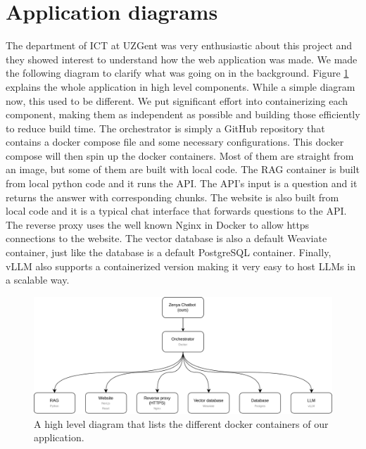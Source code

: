 \section{Application diagrams}
The department of ICT at UZGent was very enthusiastic about this project and they showed interest to understand how the web application was made. We made the following diagram to clarify what was going on in the background. Figure \ref{fig:architecture_docker} explains the whole application in high level components. While a simple diagram now, this used to be different. We put significant effort into containerizing each component, making them as independent as possible and building those efficiently to reduce build time. The orchestrator is simply a GitHub repository that contains a docker compose file and some necessary configurations. This docker compose will then spin up the docker containers. Most of them are straight from an image, but some of them are built with local code. The RAG container is built from local python code and it runs the API. The API's input is a question and it returns the answer with corresponding chunks. The website is also built from local code and it is a typical chat interface that forwards questions to the API. The reverse proxy uses the well known Nginx \cite{nginx} in Docker \cite{docker} to allow https connections to the website. The vector database is also a default Weaviate \cite{weaviate} container, just like the database is a default PostgreSQL \cite{postgresql} container. Finally, vLLM \cite{kwon2023efficient} also supports a containerized version making it very easy to host LLMs in a scalable way.

\begin{figure}[H]
    \captionsetup{justification=centering}
    \centerline{\includegraphics[width=1\linewidth]{fig/Architecture Docker.png}}
    \caption{A high level diagram that lists the different docker containers of our application.}
    \label{fig:architecture_docker}
\end{figure}

